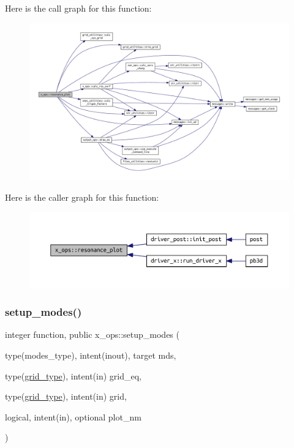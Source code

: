 Here is the call graph for this function\+:\nopagebreak
\begin{figure}[H]
\begin{center}
\leavevmode
\includegraphics[width=350pt]{namespacex__ops_abdaf1308e13cede3a153e8c6cf35a637_cgraph}
\end{center}
\end{figure}
Here is the caller graph for this function\+:\nopagebreak
\begin{figure}[H]
\begin{center}
\leavevmode
\includegraphics[width=350pt]{namespacex__ops_abdaf1308e13cede3a153e8c6cf35a637_icgraph}
\end{center}
\end{figure}
\mbox{\label{namespacex__ops_a504451aabcab7d6f0fa59feae08ef8dd}} 
\subsubsection{\texorpdfstring{setup\+\_\+modes()}{setup\_modes()}}
{\footnotesize\ttfamily integer function, public x\+\_\+ops\+::setup\+\_\+modes (\begin{DoxyParamCaption}\item[{type(modes\+\_\+type), intent(inout), target}]{mds,  }\item[{type(\hyperlink{structgrid__vars_1_1grid__type}{grid\+\_\+type}), intent(in)}]{grid\+\_\+eq,  }\item[{type(\hyperlink{structgrid__vars_1_1grid__type}{grid\+\_\+type}), intent(in)}]{grid,  }\item[{logical, intent(in), optional}]{plot\+\_\+nm }\end{DoxyParamCaption})}



